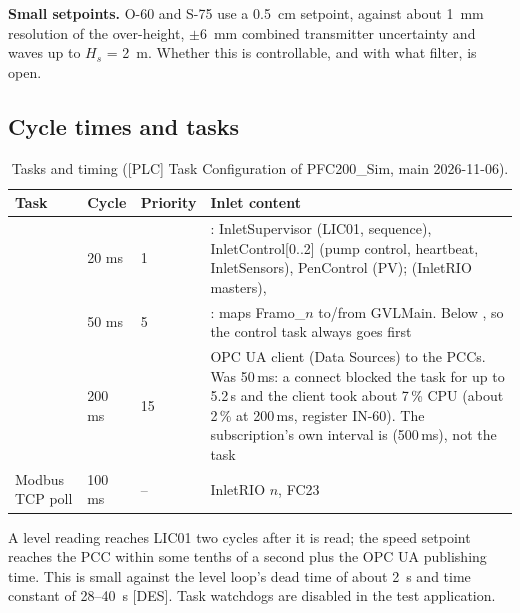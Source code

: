 \documentclass[11pt,a4paper]{article}
\begin{document}
\textbf{Small setpoints.} O-60 and S-75 use a 0.5~cm setpoint, against about 1~mm resolution of the
over-height, $\pm$6~mm combined transmitter uncertainty and waves up to $H_s$ = 2~m. Whether this is
controllable, and with what filter, is open.

\subsection{Cycle times and tasks}
\begin{table}[htbp]
\centering\small
\caption{Tasks and timing ([PLC] Task Configuration of PFC200\_Sim, main 2026-11-06).}
\label{tab:tasks}
\begin{tabularx}{\textwidth}{@{}P{30mm}P{14mm}P{12mm}L@{}}
\toprule
Task & Cycle & Priority & Inlet content \\
\midrule
{} & 20 ms & 1 & : InletSupervisor (LIC01, sequence), InletControl[0..2] (pump control, heartbeat, InletSensors), PenControl (PV);  (InletRIO masters),  \\
 & 50 ms & 5 & : maps Framo\_$n$ to/from GVLMain. Below , so the control task always goes first \\
 & 200 ms & 15 & OPC UA client (Data Sources) to the PCCs. Was 50\,ms: a connect blocked the task for up to 5.2\,s and the client took about 7\,\% CPU (about 2\,\% at 200\,ms, register IN-60). The subscription's own interval is  (500\,ms), not the task \\
Modbus TCP poll & 100 ms & -- & InletRIO $n$, FC23 \\
\bottomrule
\end{tabularx}
\end{table}
A level reading reaches LIC01 two  cycles after it is read; the speed setpoint reaches the
PCC within some tenths of a second plus the OPC UA publishing time. This is small against the level
loop's dead time of about 2~s and time constant of 28--40~s [DES]. Task watchdogs are disabled in the
test application.
\end{document}
